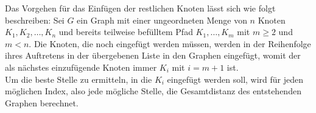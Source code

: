
Das Vorgehen für das Einfügen der restlichen Knoten lässt sich wie folgt beschreiben: 
Sei $G$ ein Graph mit einer ungeordneten Menge von $n$ Knoten  $K_1,K_2,\ldots,K_n$ und bereits teilweise befülltem Pfad $K_1,\ldots,K_m$ mit $m \geq 2$ und $m < n$.
Die Knoten, die noch eingefügt werden müssen, werden in der Reihenfolge ihres Auftretens in der übergebenen Liste in den Graphen eingefügt, womit der als nächstes einzufügende Knoten immer $K_{i}$ mit $i = m + 1$ ist.
\\
Um die beste Stelle zu ermitteln, in die $K_i$ eingefügt werden soll, wird für jeden möglichen Index, also jede mögliche Stelle, die Gesamtdistanz des entstehenden Graphen berechnet. 


